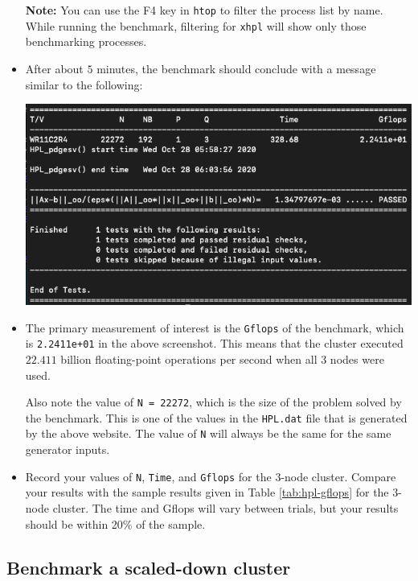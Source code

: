 \documentclass{article}
\begin{document}
\begin{itemize}
    \textbf{Note:} You can use the F4 key in \texttt{htop} to filter the process list by name. While running the benchmark, filtering for \texttt{xhpl} will show only those benchmarking processes.

    \item After about $5$ minutes, the benchmark should conclude with a message similar to the following:
    
    \includegraphics[width=\textwidth]{images/hpl-results.png}
    
    \item The primary measurement of interest is the \texttt{Gflops} of the benchmark, which is \texttt{2.2411e+01} in the above screenshot. This means that the cluster executed $22.411$ billion floating-point operations per second when all $3$ nodes were used.
    
    Also note the value of \texttt{N = 22272}, which is the size of the problem solved by the benchmark. This is one of the values in the \texttt{HPL.dat} file that is generated by the above website. The value of \texttt{N} will always be the same for the same generator inputs.
    
    \item Record your values of \texttt{N}, \texttt{Time}, and \texttt{Gflops} for the $3$-node cluster. Compare your results with the sample results given in Table \ref{tab:hpl-gflops} for the 3-node cluster. The time and Gflops will vary between trials, but your results should be within 20\% of the sample.
\end{itemize}


    
\subsection{Benchmark a scaled-down cluster}
\end{document}
